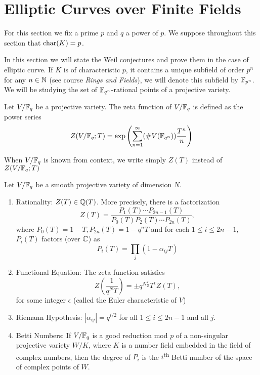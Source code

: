 \section{Elliptic Curves over Finite Fields}

For this section we fix a prime $p$ and $q$ a power of $p$.
We suppose throughout this section that $\operatorname{char}(K) = p$.

In this section we will state the Weil conjectures and prove them in the
case of elliptic curve.
If $K$ is of characteristic $p$,
it contains a unique subfield of order $p^n$ for any $n \in \mathbb{N}$ (see
course \emph{Rings and Fields}), we will denote this subfield by $\mathbb{F}_{p^n}$.
We will be studying the set of
$\mathbb{F}_{q^n}$-rational points of a projective variety.

\begin{definition}
	Let $V/\mathbb{F}_q$ be a projective variety.
	The zeta function of $V/\mathbb{F}_q$ is defined as the power series
	\begin{equation*}
		Z(V/\mathbb{F}_q; T) = \exp\left(\sum_{n=1}^\infty (\#V(\mathbb{F}_{q^n}))
		\frac{T^n}{n}\right)
	\end{equation*}
\end{definition}

\begin{notation}
	When $V/\mathbb{F}_q$ is known from context, we write simply $Z(T)$
	instead of $Z(V/\mathbb{F}_q; T)$
\end{notation}

\begin{theorem}
	\label{thm:weil}
	Let $V/\mathbb{F}_q$ be a smooth projective variety of dimension $N$.
	\begin{enumerate}[label=(\alph*)]
		\item Rationality: $Z(T) \in \mathbb{Q}(T)$. More precisely, 
			there is a factorization
			\begin{equation*}
				Z(T) = \frac{P_1(T)\cdots P_{2n-1}(T)}
				{P_0(T)P_2(T) \cdots P_{2n}(T)},
			\end{equation*}
			where $P_0(T) = 1 - T, P_{2n}(T) = 1 - q^nT$ and for each
			$1 \leq i \leq 2n - 1$, $P_i(T)$ factors (over $\mathbb{C}$) as
			\begin{equation*}
				P_i(T) = \prod_j (1 - \alpha_{ij}T)
			\end{equation*}
		\item Functional Equation: The zeta function satisfies
			\begin{equation*}
				Z\left(\frac{1}{q^NT}\right) = \pm q^{N\frac{\epsilon}{2}}
				T^{\epsilon} Z(T),
			\end{equation*}
			for some integer $\epsilon$ (called the Euler characteristic of $V$)
		\item Riemann Hypothesis: $|\alpha_{ij}| = q^{i/2}$
			for all $1 \leq i \leq 2n - 1$ and all $j$.
		\item Betti Numbers: If $V/\mathbb{F}_q$ is a good reduction mod $p$ of a
			non-singular projective variety $W/K$, where $K$ is a number
			field embedded in the field of complex numbers, then the degree
			of $P_i$ is the $i$\textsuperscript{th} Betti number of the space
			of complex points of $W$. 
	\end{enumerate}
\end{theorem}

